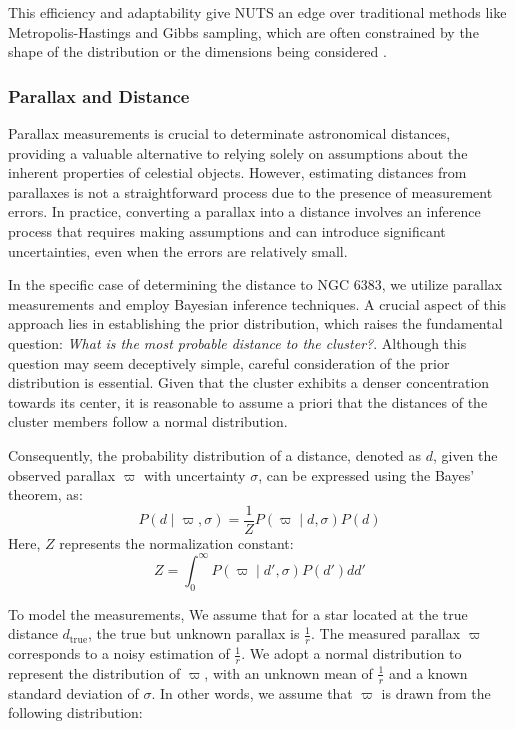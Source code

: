 \documentclass[fleqn,usenatbib,usedcolumn,useAMS]{mnras}
\begin{document}
This efficiency and adaptability give NUTS an edge over traditional methods like Metropolis-Hastings and Gibbs sampling, which are often constrained by the shape of the distribution or the dimensions being considered \citep{phan2019composable}.

\subsubsection{Parallax and Distance}

Parallax measurements is crucial to determinate astronomical distances, providing a valuable alternative to relying solely on assumptions about the inherent properties of celestial objects. However, estimating distances from parallaxes is not a straightforward process due to the presence of measurement errors. In practice, converting a parallax into a distance involves an inference process that requires making assumptions and can introduce significant uncertainties, even when the errors are relatively small.

In the specific case of determining the distance to NGC 6383, we utilize parallax measurements and employ Bayesian inference techniques. A crucial aspect of this approach lies in establishing the prior distribution, which raises the fundamental question: \textit{What is the most probable distance to the cluster?}. Although this question may seem deceptively simple, careful consideration of the prior distribution is essential. Given that the cluster exhibits a denser concentration towards its center, it is reasonable to assume a priori that the distances of the cluster members follow a normal distribution.

Consequently, the probability distribution of a distance, denoted as $d$, given the observed parallax $\varpi$ with uncertainty $\sigma$, can be expressed using the Bayes' theorem, as:
\begin{equation}
P(d\mid \varpi,\sigma) = \frac{1}{Z}P(\varpi \mid d,\sigma)P(d)
\end{equation}
Here, $Z$ represents the normalization constant:
\begin{equation}
Z = \int_{0}^\infty P(\varpi \mid d',\sigma)P(d') dd'
\end{equation}

To model the measurements, We assume that for a star located at the true distance $d_{\textrm{true}}$, the true but unknown parallax is $\frac{1}{r}$. The measured parallax $\varpi$ corresponds to a noisy estimation of $\frac{1}{r}$. We adopt a normal distribution to represent the distribution of $\varpi$, with an unknown mean of $\frac{1}{r}$ and a known standard deviation of $\sigma$. In other words, we assume that $\varpi$ is drawn from the following distribution:
\end{document}
